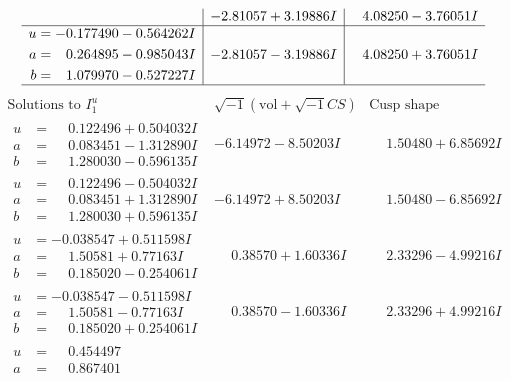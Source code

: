 \documentclass[1p]{elsarticle_modified}
\theoremstyle{definition}
\newcommand{\I}{\sqrt{-1}}
\begin{document}
$$\begin{array}{c|c|c}
 & -2.81057 + 3.19886 I & \phantom{-}4.08250 - 3.76051 I \\ \hline\begin{aligned}
u &= -0.177490 - 0.564262 I \\
a &= \phantom{-}0.264895 - 0.985043 I \\
b &= \phantom{-}1.079970 - 0.527227 I\end{aligned}
 & -2.81057 - 3.19886 I & \phantom{-}4.08250 + 3.76051 I\\
 \hline 
 \end{array}$$\newpage$$\begin{array}{c|c|c}  
\text{Solutions to }I^u_{1}& \I (\text{vol} + \sqrt{-1}CS) & \text{Cusp shape}\\
 \hline 
\begin{aligned}
u &= \phantom{-}0.122496 + 0.504032 I \\
a &= \phantom{-}0.083451 - 1.312890 I \\
b &= \phantom{-}1.280030 - 0.596135 I\end{aligned}
 & -6.14972 - 8.50203 I & \phantom{-}1.50480 + 6.85692 I \\ \hline\begin{aligned}
u &= \phantom{-}0.122496 - 0.504032 I \\
a &= \phantom{-}0.083451 + 1.312890 I \\
b &= \phantom{-}1.280030 + 0.596135 I\end{aligned}
 & -6.14972 + 8.50203 I & \phantom{-}1.50480 - 6.85692 I \\ \hline\begin{aligned}
u &= -0.038547 + 0.511598 I \\
a &= \phantom{-}1.50581 + 0.77163 I \\
b &= \phantom{-}0.185020 - 0.254061 I\end{aligned}
 & \phantom{-}0.38570 + 1.60336 I & \phantom{-}2.33296 - 4.99216 I \\ \hline\begin{aligned}
u &= -0.038547 - 0.511598 I \\
a &= \phantom{-}1.50581 - 0.77163 I \\
b &= \phantom{-}0.185020 + 0.254061 I\end{aligned}
 & \phantom{-}0.38570 - 1.60336 I & \phantom{-}2.33296 + 4.99216 I \\ \hline\begin{aligned}
u &= \phantom{-}0.454497\phantom{ +0.000000I} \\
a &= \phantom{-}0.867401\phantom{ +0.000000I} \\

\end{aligned}
\end{array}$$
\end{document}
